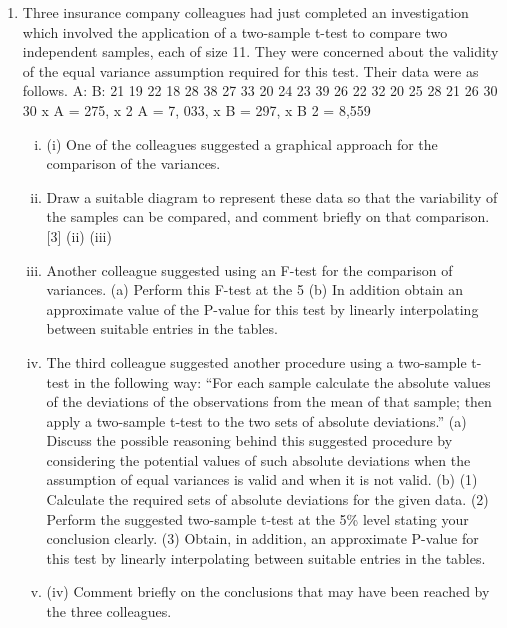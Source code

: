 \documentclass[a4paper,12pt]{article}
\begin{document}
\begin{enumerate}
\item Three insurance company colleagues had just completed an investigation which
involved the application of a two-sample t-test to compare two independent samples, each of size 11. They were concerned about the validity of the equal variance assumption required for this test. Their data were as follows.
A:
B:
21
19
22
18
28
38
27
33
20
24
23
39
26
22
32
20
25
28
21
26
30
30
\sigma  x A = 275, \sigma  x 2 A = 7, 033, \sigma  x B = 297, \sigma  x B 2 = 8,559
\begin{enumerate}[(i)]
\item (i)
One of the colleagues suggested a graphical approach for the comparison of the variances.
\item Draw a suitable diagram to represent these data so that the variability of the samples can be compared, and comment briefly on that comparison.
[3]
(ii)
(iii)
\item Another colleague suggested using an F-test for the comparison of variances.
(a) Perform this F-test at the 5%
(b) In addition obtain an approximate value of the P-value for this test by linearly interpolating between suitable entries in the tables.
\item 
The third colleague suggested another procedure using a two-sample t-test in the following way:
“For each sample calculate the absolute values of the deviations of the observations from the mean of that sample;
then apply a two-sample t-test to the two sets of absolute deviations.”
(a) Discuss the possible reasoning behind this suggested procedure by considering the potential values of such absolute deviations when the assumption of equal variances is valid and when it is not valid.
(b) (1) Calculate the required sets of absolute deviations for the given
data.
(2) Perform the suggested two-sample t-test at the 5\% level stating your conclusion clearly.
(3) Obtain, in addition, an approximate P-value for this test by linearly interpolating between suitable entries in the tables.
\item (iv)
Comment briefly on the conclusions that may have been reached by the three
colleagues.
\end{enumerate}
\newpage


\end{enumerate}
\end{document}

